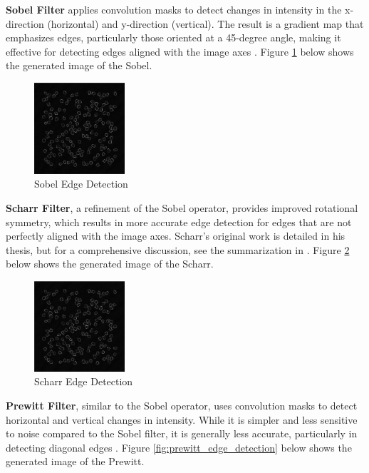 \documentclass[%
	a4paper, %
	12pt, %
	english, %
	bibtotoc %
]{scrartcl}
\begin{document}
\textbf{Sobel Filter} applies convolution masks to detect changes in intensity in the x-direction (horizontal) and y-direction (vertical). The result is a gradient map that emphasizes edges, particularly those oriented at a 45-degree angle, making it effective for detecting edges aligned with the image axes \cite{Gonzalez2008}. Figure \ref{fig:sobel_edge_detection} below shows the generated image of the Sobel.

\begin{figure}[H]
    \centering
    \includegraphics[width=0.3\textwidth]{latex-template-ss24/images/Sobel_edge_detection.png}
    \caption{Sobel Edge Detection}
    \label{fig:sobel_edge_detection}
\end{figure}

\textbf{Scharr Filter}, a refinement of the Sobel operator, provides improved rotational symmetry, which results in more accurate edge detection for edges that are not perfectly aligned with the image axes. Scharr's original work is detailed in his thesis, but for a comprehensive discussion, see the summarization in \cite{Gonzalez2008}. Figure \ref{fig:scharr_edge_detection} below shows the generated image of the Scharr.

\begin{figure}[H]
    \centering
    \includegraphics[width=0.3\textwidth]{latex-template-ss24/images/Scharr_edge_detection.png}
    \caption{Scharr Edge Detection}
    \label{fig:scharr_edge_detection}
\end{figure}

\textbf{Prewitt Filter}, similar to the Sobel operator, uses convolution masks to detect horizontal and vertical changes in intensity. While it is simpler and less sensitive to noise compared to the Sobel filter, it is generally less accurate, particularly in detecting diagonal edges \cite{Gonzalez2008}. Figure \ref{fig:prewitt_edge_detection} below shows the generated image of the Prewitt.
\end{document}
